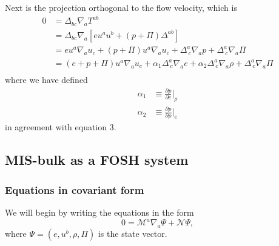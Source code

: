 \documentclass[12pt]{article}
\numberwithin{equation}{section}
\begin{document}
Next is the projection orthogonal to the flow velocity, which is
\begin{equation}
\begin{aligned}
0 &= \Delta_{bc} \nabla_{a} T^{ab} \\
&= \Delta_{bc} \nabla_{a} [e u^a u^b + (p + \Pi) \Delta^{ab}] \\
&= e u^a \nabla_{a} u_c + (p + \Pi) u^a \nabla_{a} u_c + \Delta^{a}_{~c} \nabla_{a} p + \Delta^{a}_{~c} \nabla_{a} \Pi \\
&= (e + p + \Pi) u^a \nabla_{a} u_c + \alpha_1 \Delta^{a}_{~c} \nabla_a e + \alpha_2 \Delta^{a}_{~c} \nabla_a \rho + \Delta^{a}_{~c} \nabla_{a} \Pi \\
\end{aligned}
\end{equation}
where we have defined
\begin{align}
\alpha_1 &\equiv \frac{\partial p}{\partial e} \Big|_\rho \\
\alpha_2 &\equiv \frac{\partial p}{\partial \rho} \Big|_e
\end{align}
in agreement with \cite{Bemfica19} equation 3.

\subsection{MIS-bulk as a FOSH system}

\subsubsection{Equations in covariant form}

We will begin by writing the equations in the form
\begin{equation}
0 = \mathcal{M}^a \nabla_a \Psi + \mathcal{N} \Psi,
\end{equation}
where $\Psi = (e, u^b, \rho, \Pi)$ is the state vector.
\end{document}
